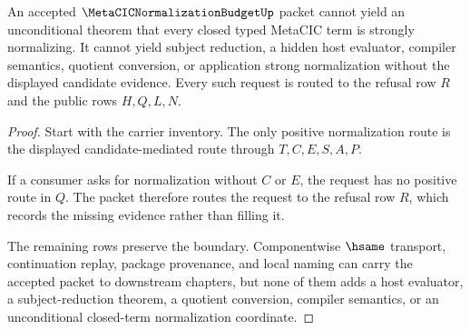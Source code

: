 \begin{theorem}
\label{thm:metacic-normalization-budget-nonescape}
An accepted $\MetaCICNormalizationBudgetUp$ packet cannot yield an unconditional theorem that every closed typed MetaCIC term is strongly normalizing. It cannot yield subject reduction, a hidden host evaluator, compiler semantics, quotient conversion, or application strong normalization without the displayed candidate evidence. Every such request is routed to the refusal row $R$ and the public rows $H,Q,L,N$.
\end{theorem}
\begin{proof}
Start with the carrier inventory. The only positive normalization route is the displayed candidate-mediated route through $T,C,E,S,A,P$.

If a consumer asks for normalization without $C$ or $E$, the request has no positive route in $Q$. The packet therefore routes the request to the refusal row $R$, which records the missing evidence rather than filling it.

The remaining rows preserve the boundary. Componentwise $\hsame$ transport, continuation replay, package provenance, and local naming can carry the accepted packet to downstream chapters, but none of them adds a host evaluator, a subject-reduction theorem, a quotient conversion, compiler semantics, or an unconditional closed-term normalization coordinate.
\end{proof}

